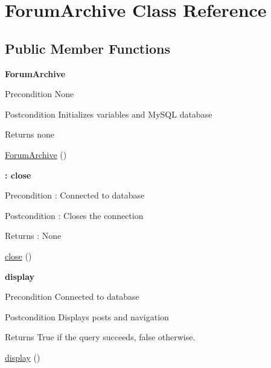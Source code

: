 \hypertarget{class_forum_archive}{}\section{Forum\+Archive Class Reference}
\label{class_forum_archive}
\subsection*{Public Member Functions}
\begin{Indent}{\bf Forum\+Archive}\par
{\em \begin{DoxyPrecond}{Precondition}
None 
\end{DoxyPrecond}
\begin{DoxyPostcond}{Postcondition}
Initializes variables and My\+S\+QL database 
\end{DoxyPostcond}
\begin{DoxyReturn}{Returns}
none 
\end{DoxyReturn}
}\begin{DoxyCompactItemize}
\item 
\hyperlink{class_forum_archive_a62a8114cc9eaa3af25c48ea1ccfc37f0}{Forum\+Archive} ()
\end{DoxyCompactItemize}
\end{Indent}
\begin{Indent}{\bf \+: close}\par
{\em \begin{DoxyPrecond}{Precondition}
\+: Connected to database 
\end{DoxyPrecond}
\begin{DoxyPostcond}{Postcondition}
\+: Closes the connection 
\end{DoxyPostcond}
\begin{DoxyReturn}{Returns}
\+: None 
\end{DoxyReturn}
}\begin{DoxyCompactItemize}
\item 
\hyperlink{class_forum_archive_aa69c8bf1f1dcf4e72552efff1fe3e87e}{close} ()
\end{DoxyCompactItemize}
\end{Indent}
\begin{Indent}{\bf display}\par
{\em \begin{DoxyPrecond}{Precondition}
Connected to database 
\end{DoxyPrecond}
\begin{DoxyPostcond}{Postcondition}
Displays posts and navigation 
\end{DoxyPostcond}
\begin{DoxyReturn}{Returns}
True if the query succeeds, false otherwise. 
\end{DoxyReturn}
}\begin{DoxyCompactItemize}
\item 
\hyperlink{class_forum_archive_a0b9b6e6acd4a839fc7c2f26f96b5cfa8}{display} ()
\end{DoxyCompactItemize}
\end{Indent}


